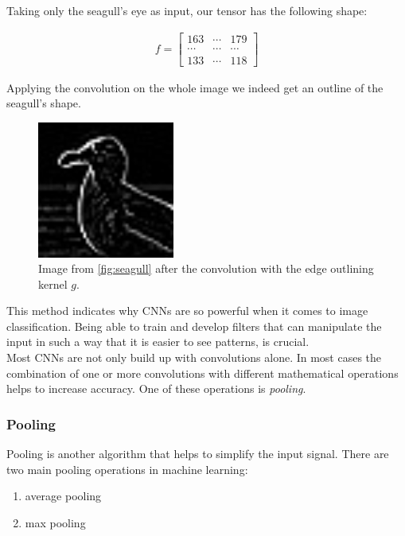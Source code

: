 Taking only the seagull's eye as input, our tensor has the following shape:

\begin{gather}
    f = \begin{bmatrix}
163 & \cdots & 179\\
\cdots & \cdots & \cdots \\
133 & \cdots & 118
\end{bmatrix}
\end{gather}

Applying the convolution on the whole image we indeed get an outline of the seagull's shape.

\begin{figure}[ht]
 \centering
 \includegraphics[width=0.4\textwidth]{images/Chapter2/2DConvolved.jpg}
 \caption{Image from \autoref{fig:seagull} after the convolution with the edge outlining kernel $g$.} 
 \label{fig:seagull_conv2d}
\end{figure}

This method indicates why CNNs are so powerful when it comes to image classification. Being able to train and develop filters that can manipulate the input in such a way that it is easier to see patterns, is crucial. \\
Most CNNs are not only build up with convolutions alone. In most cases the combination of one or more convolutions with different mathematical operations helps to increase accuracy. One of these operations is \textit{pooling}.

\subsubsection*{Pooling}
Pooling is another algorithm that helps to simplify the input signal. There are two main pooling operations in machine learning:

\begin{enumerate}
    \item average pooling
    \item max pooling
\end{enumerate}

